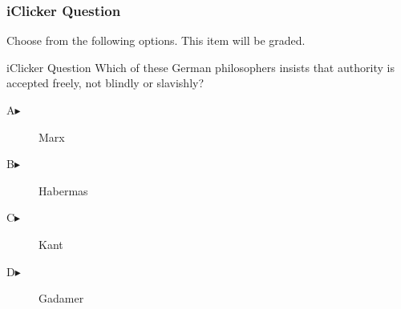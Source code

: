 \begin{frame}
  \frametitle{iClicker Question}
Choose from the following options. This item will be graded.
\begin{block}{iClicker Question}
  Which of these German philosophers insists that authority is
  accepted freely, not blindly or slavishly?
\end{block}
\begin{description}
\item[A\hspace{.2in}$\blacktriangleright$] Marx
\item[B\hspace{.2in}$\blacktriangleright$] Habermas
\item[C\hspace{.2in}$\blacktriangleright$] Kant
\item[D\hspace{.2in}$\blacktriangleright$] Gadamer
\end{description}
\end{frame}

